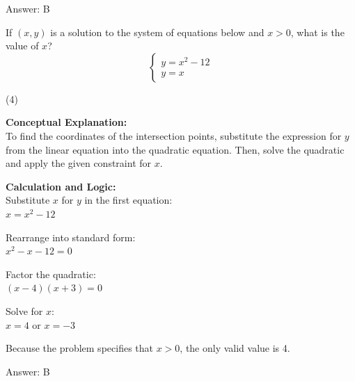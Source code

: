 \documentclass[11pt,paper=a4,answers]{exam}
\begin{document}
\begin{questions}
\begin{solution}
Answer: \colorbox{yellow!100}{B}
\end{solution}

\vspace{40pt}

\question
If $(x, y)$ is a solution to the system of equations below and $x > 0$, what is the value of $x$?
\[ \begin{cases} y = x^2 - 12 \\ y = x \end{cases} \]
\begin{tasks}(4)
\end{tasks}

\begin{solution}
\textbf{Conceptual Explanation:} \\
To find the coordinates of the intersection points, substitute the expression for $y$ from the linear equation into the quadratic equation. Then, solve the quadratic and apply the given constraint for $x$.

\vspace{20pt}

\textbf{Calculation and Logic:} \\
Substitute $x$ for $y$ in the first equation: \\
$x = x^2 - 12$

\vspace{10pt}

Rearrange into standard form: \\
$x^2 - x - 12 = 0$

\vspace{10pt}

Factor the quadratic: \\
$(x - 4)(x + 3) = 0$

\vspace{10pt}

Solve for $x$: \\
$x = 4$ or $x = -3$

\vspace{10pt}

Because the problem specifies that $x > 0$, the only valid value is 4.

\vspace{25pt}

Answer: \colorbox{yellow!100}{B}
\end{solution}

\vspace{40pt}


\end{questions}
\end{document}
